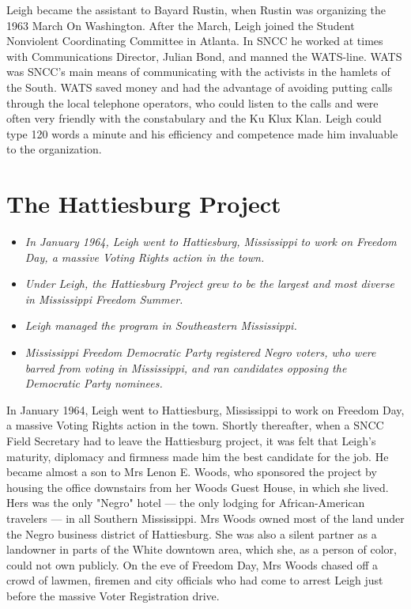 Leigh became the assistant to Bayard Rustin, when Rustin was organizing
the 1963 March On Washington. After the March, Leigh joined the Student
Nonviolent Coordinating Committee in Atlanta. In SNCC he worked at times
with Communications Director, Julian Bond, and manned the WATS-line.
WATS was SNCC's main means of communicating with the activists in the
hamlets of the South. WATS saved money and had the advantage of avoiding
putting calls through the local telephone operators, who could listen to
the calls and were often very friendly with the constabulary and the Ku
Klux Klan. Leigh could type 120 words a minute and his efficiency and
competence made him invaluable to the organization.

\section{The Hattiesburg Project}\label{the-hattiesburg-project}

\begin{itemize}
\item
  \emph{In January 1964, Leigh went to Hattiesburg, Mississippi to work
  on Freedom Day, a massive Voting Rights action in the town.}
\item
  \emph{Under Leigh, the Hattiesburg Project grew to be the largest and
  most diverse in Mississippi Freedom Summer.}
\item
  \emph{Leigh managed the program in Southeastern Mississippi.}
\item
  \emph{Mississippi Freedom Democratic Party registered Negro voters,
  who were barred from voting in Mississippi, and ran candidates
  opposing the Democratic Party nominees.}
\end{itemize}

In January 1964, Leigh went to Hattiesburg, Mississippi to work on
Freedom Day, a massive Voting Rights action in the town. Shortly
thereafter, when a SNCC Field Secretary had to leave the Hattiesburg
project, it was felt that Leigh's maturity, diplomacy and firmness made
him the best candidate for the job. He became almost a son to Mrs Lenon
E. Woods, who sponsored the project by housing the office downstairs
from her Woods Guest House, in which she lived. Hers was the only
"Negro" hotel --- the only lodging for African-American travelers --- in
all Southern Mississippi. Mrs Woods owned most of the land under the
Negro business district of Hattiesburg. She was also a silent partner as
a landowner in parts of the White downtown area, which she, as a person
of color, could not own publicly. On the eve of Freedom Day, Mrs Woods
chased off a crowd of lawmen, firemen and city officials who had come to
arrest Leigh just before the massive Voter Registration drive.

